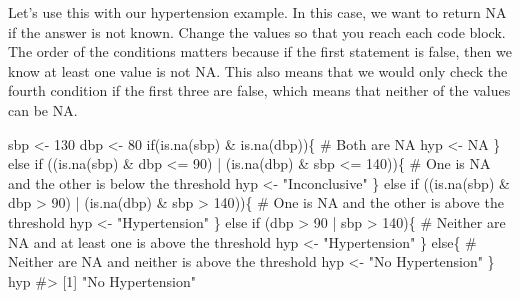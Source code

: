 \documentclass[
  letterpaper,
]{latex/krantz}
\makeatletter
\newenvironment{Shaded}{\begin{snugshade}}{\end{snugshade}}
\newcommand{\CommentTok}[1]{\textcolor[rgb]{0.37,0.37,0.37}{#1}}
\newcommand{\ConstantTok}[1]{\textcolor[rgb]{0.56,0.35,0.01}{#1}}
\newcommand{\ControlFlowTok}[1]{\textcolor[rgb]{0.00,0.23,0.31}{#1}}
\newcommand{\DecValTok}[1]{\textcolor[rgb]{0.68,0.00,0.00}{#1}}
\newcommand{\FunctionTok}[1]{\textcolor[rgb]{0.28,0.35,0.67}{#1}}
\newcommand{\NormalTok}[1]{\textcolor[rgb]{0.00,0.23,0.31}{#1}}
\newcommand{\OtherTok}[1]{\textcolor[rgb]{0.00,0.23,0.31}{#1}}
\newcommand{\SpecialCharTok}[1]{\textcolor[rgb]{0.37,0.37,0.37}{#1}}
\newcommand{\StringTok}[1]{\textcolor[rgb]{0.13,0.47,0.30}{#1}}
\newenvironment{kframe}{%
\medskip{}
\setlength{\fboxsep}{.8em}
 \def\at@end@of@kframe{}%
 \ifinner\ifhmode%
  \def\at@end@of@kframe{\end{minipage}}%
  \begin{minipage}{\columnwidth}%
 \fi\fi%
 \def\FrameCommand##1{\hskip\@totalleftmargin \hskip-\fboxsep
 \colorbox{shadecolor}{##1}\hskip-\fboxsep
     \hskip-\linewidth \hskip-\@totalleftmargin \hskip\columnwidth}%
 \MakeFramed {\advance\hsize-\width
   \@totalleftmargin\z@ \linewidth\hsize
   \@setminipage}}%
 {\par\unskip\endMakeFramed%
 \at@end@of@kframe}
\renewenvironment{Shaded}{\begin{kframe}}{\end{kframe}}
\makeatother
\begin{document}
Let's use this with our hypertension example. In this case, we want to
return NA if the answer is not known. Change the values so that you
reach each code block. The order of the conditions matters because if
the first statement is false, then we know at least one value is not NA.
This also means that we would only check the fourth condition if the
first three are false, which means that neither of the values can be NA.

\begin{Shaded}
\begin{Highlighting}[]
\NormalTok{sbp }\OtherTok{\textless{}{-}} \DecValTok{130}
\NormalTok{dbp }\OtherTok{\textless{}{-}} \DecValTok{80}
\ControlFlowTok{if}\NormalTok{(}\FunctionTok{is.na}\NormalTok{(sbp) }\SpecialCharTok{\&} \FunctionTok{is.na}\NormalTok{(dbp))\{}
  \CommentTok{\# Both are NA}
\NormalTok{  hyp }\OtherTok{\textless{}{-}} \ConstantTok{NA}
\NormalTok{\} }\ControlFlowTok{else} \ControlFlowTok{if}\NormalTok{ ((}\FunctionTok{is.na}\NormalTok{(sbp) }\SpecialCharTok{\&}\NormalTok{ dbp }\SpecialCharTok{\textless{}=} \DecValTok{90}\NormalTok{) }\SpecialCharTok{|}\NormalTok{ (}\FunctionTok{is.na}\NormalTok{(dbp) }\SpecialCharTok{\&}\NormalTok{ sbp }\SpecialCharTok{\textless{}=} \DecValTok{140}\NormalTok{))\{}
  \CommentTok{\# One is NA and the other is below the threshold}
\NormalTok{  hyp }\OtherTok{\textless{}{-}} \StringTok{"Inconclusive"}
\NormalTok{\} }\ControlFlowTok{else} \ControlFlowTok{if}\NormalTok{ ((}\FunctionTok{is.na}\NormalTok{(sbp) }\SpecialCharTok{\&}\NormalTok{ dbp }\SpecialCharTok{\textgreater{}} \DecValTok{90}\NormalTok{) }\SpecialCharTok{|}\NormalTok{ (}\FunctionTok{is.na}\NormalTok{(dbp) }\SpecialCharTok{\&}\NormalTok{ sbp }\SpecialCharTok{\textgreater{}} \DecValTok{140}\NormalTok{))\{}
  \CommentTok{\# One is NA and the other is above the threshold}
\NormalTok{  hyp }\OtherTok{\textless{}{-}} \StringTok{"Hypertension"}
\NormalTok{\} }\ControlFlowTok{else} \ControlFlowTok{if}\NormalTok{ (dbp }\SpecialCharTok{\textgreater{}} \DecValTok{90} \SpecialCharTok{|}\NormalTok{ sbp }\SpecialCharTok{\textgreater{}} \DecValTok{140}\NormalTok{)\{}
  \CommentTok{\# Neither are NA and at least one is above the threshold}
\NormalTok{  hyp }\OtherTok{\textless{}{-}} \StringTok{"Hypertension"}
\NormalTok{\} }\ControlFlowTok{else}\NormalTok{\{}
  \CommentTok{\# Neither are NA and neither is above the threshold}
\NormalTok{  hyp }\OtherTok{\textless{}{-}} \StringTok{"No Hypertension"}
\NormalTok{\}}
\NormalTok{hyp}
\CommentTok{\#\textgreater{} [1] "No Hypertension"}
\end{Highlighting}
\end{Shaded}
\end{document}
